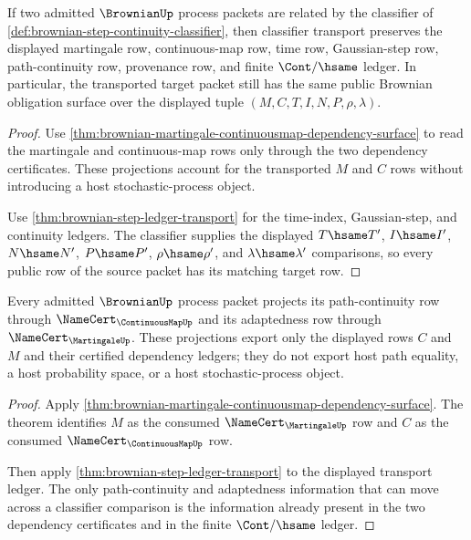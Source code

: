 \begin{theorem}
\label{thm:brownian-classifier-stability}
If two admitted $\BrownianUp$ process packets are related by the classifier of
\autoref{def:brownian-step-continuity-classifier}, then classifier transport
preserves the displayed martingale row, continuous-map row, time row,
Gaussian-step row, path-continuity row, provenance row, and finite
$\Cont/\hsame$ ledger. In particular, the transported target packet still has
the same public Brownian obligation surface over the displayed tuple
$(M,C,T,I,N,P,\rho,\lambda)$.
\end{theorem}
\begin{proof}
Use \autoref{thm:brownian-martingale-continuousmap-dependency-surface} to read
the martingale and continuous-map rows only through the two dependency
certificates. These projections account for the transported $M$ and $C$ rows
without introducing a host stochastic-process object.

Use \autoref{thm:brownian-step-ledger-transport} for the time-index,
Gaussian-step, and continuity ledgers. The classifier supplies the displayed
$T\hsame T'$, $I\hsame I'$, $N\hsame N'$, $P\hsame P'$,
$\rho\hsame\rho'$, and $\lambda\hsame\lambda'$ comparisons, so every public
row of the source packet has its matching target row.
\end{proof}

\begin{theorem}
\label{thm:brownian-continuous-path-projection}
Every admitted $\BrownianUp$ process packet projects its path-continuity row
through $\NameCert_{\ContinuousMapUp}$ and its adaptedness row through
$\NameCert_{\MartingaleUp}$. These projections export only the displayed rows
$C$ and $M$ and their certified dependency ledgers; they do not export host
path equality, a host probability space, or a host stochastic-process object.
\end{theorem}
\begin{proof}
Apply \autoref{thm:brownian-martingale-continuousmap-dependency-surface}. The
theorem identifies $M$ as the consumed $\NameCert_{\MartingaleUp}$ row and $C$
as the consumed $\NameCert_{\ContinuousMapUp}$ row.

Then apply \autoref{thm:brownian-step-ledger-transport} to the displayed
transport ledger. The only path-continuity and adaptedness information that
can move across a classifier comparison is the information already present in
the two dependency certificates and in the finite $\Cont/\hsame$ ledger.
\end{proof}

